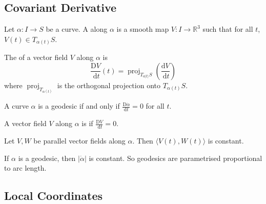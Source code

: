 \documentclass[10pt]{article}
\begin{document}
\subsection{Covariant Derivative}

\begin{definition}
    Let $\alpha: I \rightarrow S$ be a curve. A  along $\alpha$ is a smooth map $V: I \rightarrow \mathbb{R}^3$ such that for all $t$, $V(t) \in T_{\alpha(t)} S$.
\end{definition}

\begin{definition}
    The  of a vector field $V$ along $\alpha$ is
$$
\frac{\mathrm{D} V}{\mathrm{~d} t}(t)=\operatorname{proj}_{T_{a|t\rangle} S}\left(\frac{\mathrm{d} V}{\mathrm{~d} t}\right)
$$
where $\operatorname{proj}_{T_{\alpha(t)}}$ is the orthogonal projection onto $T_{\alpha(t)} S$.
\end{definition}

\begin{proposition}
    A curve $\alpha$ is a geodesic if and only if $\frac{\mathrm{D} \dot{\alpha}}{\mathrm{d} t}=0$ for all $t$.
\end{proposition}

\begin{definition}[Parallel]
    A vector field $V$ along $\alpha$ is  if $\frac{\mathrm{D} V}{\mathrm{~d} t}=0$.
\end{definition}

\begin{proposition}
    Let $V, W$ be parallel vector fields along $\alpha$. Then $\langle V(t), W(t)\rangle$ is constant.
\end{proposition}

\begin{corollary}
If $\alpha$ is a geodesic, then $|\dot{\alpha}|$ is constant. So geodesics are parametrised proportional to arc length.
\end{corollary}

\subsection{Local Coordinates}
\end{document}
